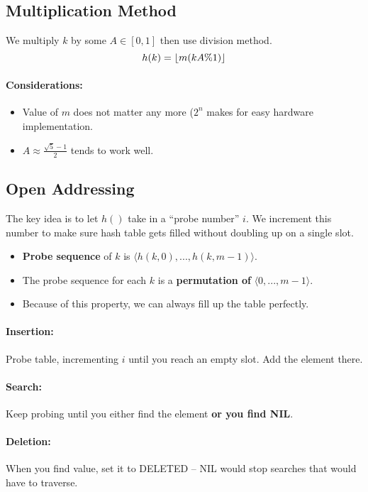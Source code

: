 \documentclass[a4paper,12pt]{report}
\DeclarePairedDelimiter{\floor}{\lfloor}{\rfloor}
\begin{document}
\subsection{Multiplication Method}

We multiply $k$ by some $A\in [0,1]$ then use division method.
\begin{equation}
h(k) = \floor{m(kA\% 1)}
\end{equation}

\paragraph{Considerations: } 
\begin{itemize}
\item Value of $m$ does not matter any more ($2^n$ makes for easy hardware implementation.
\item $A \approx \frac{\sqrt 5 - 1}{2}$ tends to work well.
\end{itemize}

\subsection{Open Addressing}

The key idea is to let $h()$ take in a ``probe number'' $i$. We increment this number to make sure hash table gets filled without doubling up on a single slot. 

\begin{itemize}
\item \textbf{Probe sequence} of $k$ is $\langle h(k,0), ..., h(k, m-1) \rangle$.
\item The probe sequence for each $k$ is a \textbf{permutation of} $\langle 0,...,m-1  \rangle$.
\item Because of this property, we can always fill up the table perfectly.
\end{itemize}

\paragraph{Insertion: } Probe table, incrementing $i$ until you reach an empty slot. Add the element there. 
\paragraph{Search: } Keep probing until you either find the element \textbf{or you find NIL}. 
\paragraph{Deletion: } When you find value, set it to DELETED -- NIL would stop searches that would have to traverse. 
\end{document}
